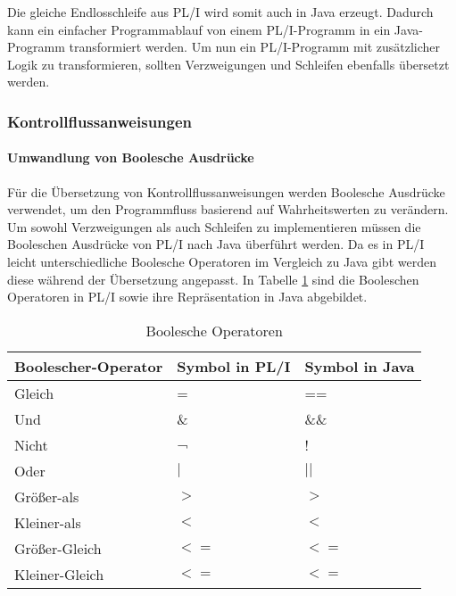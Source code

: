 Die gleiche Endlosschleife aus PL/I wird somit auch in Java erzeugt.
Dadurch kann ein einfacher Programmablauf von einem PL/I-Programm in ein Java-Programm transformiert werden.
Um nun ein PL/I-Programm mit zusätzlicher Logik zu transformieren, sollten Verzweigungen und Schleifen ebenfalls übersetzt werden.

\pagebreak
\subsubsection{Kontrollflussanweisungen}
\paragraph{Umwandlung von Boolesche Ausdrücke}
Für die Übersetzung von Kontrollflussanweisungen werden Boolesche Ausdrücke verwendet, um den Programmfluss basierend auf Wahrheitswerten zu verändern. Um sowohl Verzweigungen als auch Schleifen zu implementieren müssen die Booleschen Ausdrücke von PL/I nach Java überführt werden. Da es in PL/I leicht unterschiedliche Boolesche Operatoren im Vergleich zu Java gibt werden diese während der Übersetzung angepasst. In Tabelle \ref{tab:booloperator} sind die Booleschen Operatoren in PL/I sowie ihre Repräsentation in Java abgebildet.


\begin{table}[h]
	\centering
	\begin{tabularx}{\textwidth}{|X|X|X|}
		\hline
		\textbf{Boolescher-Operator} & \textbf{Symbol in PL/I} & \textbf{Symbol in Java}  \\
		\hline
		Gleich & = & ==  \\
		Und & \& & \&\& \\
		Nicht & ¬ & ! \\
		Oder & $\mid$ &	$\mid$$\mid$ \\
		Größer-als & $>$ & $>$ \\
		Kleiner-als & $<$ & $<$ \\
		Größer-Gleich & $<=$ & $<=$ \\
		Kleiner-Gleich & $<=$ & $<=$ \\
		\hline
		
	\end{tabularx}
	\caption{Boolesche Operatoren \label{tab:booloperator}}
\end{table}



